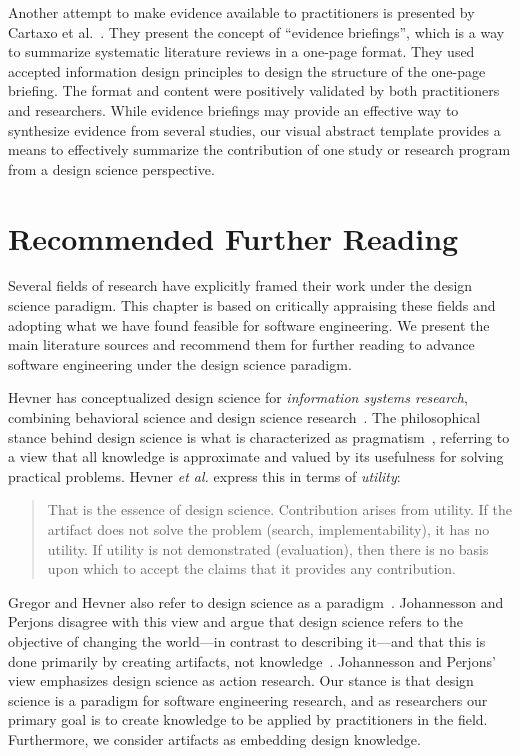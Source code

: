 \documentclass[graybox]{svmult}
\begin{document}
Another attempt to make evidence available to practitioners is presented by Cartaxo et al.~\cite{Cartaxo2016}. 
They present the concept of ``evidence briefings'', which is a way to summarize systematic literature reviews in a one-page format. 
They used accepted information design principles to design the structure of the one-page briefing. The format and content were positively validated by both practitioners and researchers. While evidence briefings may provide an effective way to synthesize evidence from several studies, our visual abstract template provides a means to effectively summarize the contribution of one study or research program from a design science perspective.

\section{Recommended Further Reading}
\label{sec:reading}
Several fields of research have explicitly framed their work under the design science paradigm. This chapter is based on critically appraising these fields and adopting what we have found feasible for software engineering. We present the main literature sources and recommend them for further reading to advance software engineering under the design science paradigm.

Hevner has conceptualized design science for \emph{information systems research}, combining behavioral science and design science research~\cite{hevner_design_2004,hevner_design_2010}.
The philosophical stance behind design science is what is characterized as pragmatism~\cite{easterbrook_selecting_2008}, referring to a view that all knowledge is approximate and valued by its usefulness for solving practical problems. Hevner \emph{et al.} express this in terms of \emph{utility}: 

\begin{quote}
	That is the essence of design science. Contribution arises from utility. If the artifact does not solve the problem (search, implementability), it has no utility. If utility is not demonstrated (evaluation), then there is no basis upon which to accept the claims that it provides any contribution.~\cite[p. 91]{hevner_design_2004}
\end{quote}


Gregor and Hevner also refer to design science as a paradigm~\cite{gregor_positioning_2013}. Johannesson and Perjons  disagree with this view and argue that design science refers to the objective of changing the world---in contrast to describing it---and that this is done primarily by creating artifacts, not knowledge~\cite{johannesson_introduction_2014}. Johannesson and Perjons' view emphasizes design science as action research. Our stance is that design science is a paradigm for software engineering research, and as researchers our primary goal is to create knowledge to be applied by practitioners in the field. Furthermore, we consider artifacts as embedding design knowledge. 
\end{document}
